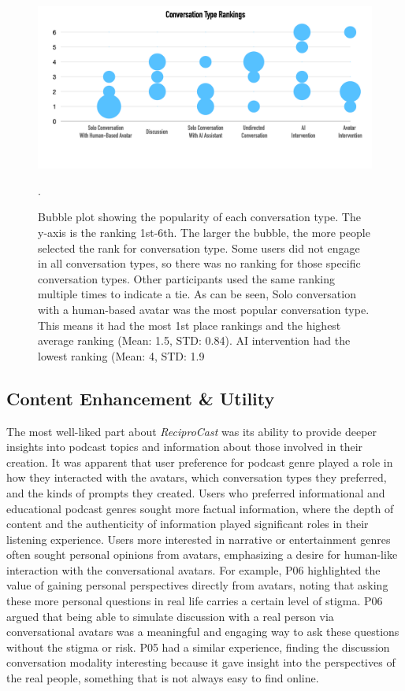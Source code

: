 \documentclass[12pt]{report}
\begin{document}
\begin{myfont}
        \begin{figure}[H]
        \centering
          \includegraphics[width=1\textwidth]{figures/convotyperank.png}
          \caption{Bubble plot showing the popularity of each conversation type. The y-axis is the ranking 1st-6th. The larger the bubble, the more people selected the rank for conversation type. Some users did not engage in all conversation types, so there was no ranking for those specific conversation types. Other participants used the same ranking multiple times to indicate a tie. As can be seen, Solo conversation with a human-based avatar was the most popular conversation type. This means it had the most 1st place rankings and the highest average ranking (Mean: 1.5, STD: 0.84). AI intervention had the lowest ranking (Mean: 4, STD: 1.9}.
          \label{fig:convotyperank}
        \end{figure}
        
        \subsection{Content Enhancement \& Utility}
        The most well-liked part about \textit{ReciproCast} was its ability to provide deeper insights into podcast topics and information about those involved in their creation. It was apparent that user preference for podcast genre played a role in how they interacted with the avatars, which conversation types they preferred, and the kinds of prompts they created. Users who preferred informational and educational podcast genres sought more factual information, where the depth of content and the authenticity of information played significant roles in their listening experience. Users more interested in narrative or entertainment genres often sought personal opinions from avatars, emphasizing a desire for human-like interaction with the conversational avatars. For example, P06 highlighted the value of gaining personal perspectives directly from avatars, noting that asking these more personal questions in real life carries a certain level of stigma. P06 argued that being able to simulate discussion with a real person via conversational avatars was a meaningful and engaging way to ask these questions without the stigma or risk. P05 had a similar experience, finding the discussion conversation modality interesting because it gave insight into the perspectives of the real people, something that is not always easy to find online.


\end{myfont}
\end{document}
